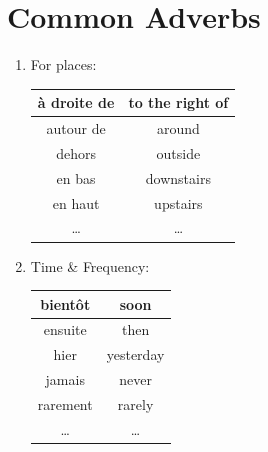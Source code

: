 \documentclass{book}
\begin{document}
    \section{Common Adverbs}
        \begin{enumerate}
            \item For places:
                \begin{center}
                    \begin{tabular}{|c|c|}
                        \hline
                        à droite de & to the right of \\
                        \hline
                        autour de & around \\
                        \hline
                        dehors & outside \\
                        \hline
                        en bas & downstairs \\
                        \hline
                        en haut & upstairs \\
                        \hline
                        \dots & \dots \\
                        \hline
                    \end{tabular}
                \end{center}

            \item Time \& Frequency:
                \begin{center}
                    \begin{tabular}{|c|c|}
                        \hline
                        bientôt & soon \\
                        \hline
                        ensuite & then \\
                        \hline
                        hier & yesterday \\
                        \hline
                        jamais & never \\
                        \hline
                        rarement & rarely \\
                        \hline
                        \dots & \dots \\
                        \hline
                    \end{tabular}
                \end{center}


\end{enumerate}
\end{document}
